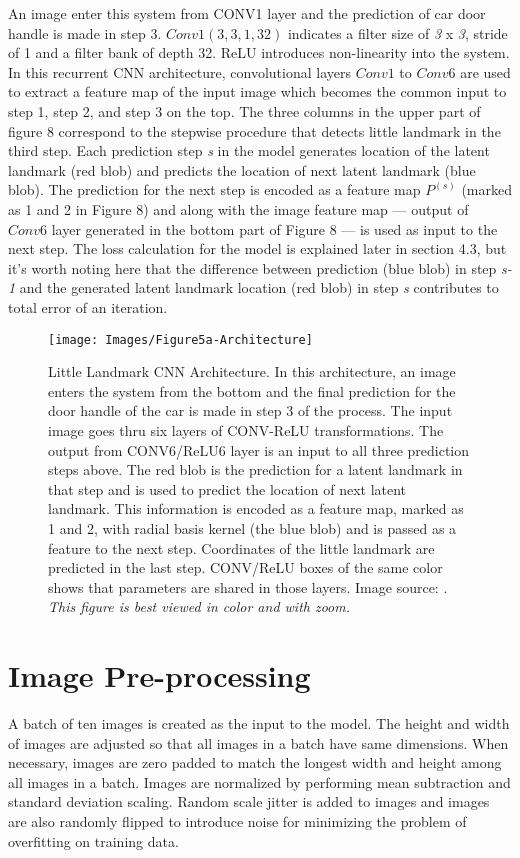 \documentclass [11pt,letterpaper ,twoside ,openany ]{report}
\begin{document}
    An image enter this system from CONV1 layer and the prediction of car door handle is made in step 3. \(Conv1(3,3,1,32) \) indicates a filter size of \textit{3} x \textit{3}, stride of 1 and a filter bank of depth 32. ReLU introduces non-linearity into the system. In this recurrent CNN architecture, convolutional layers \(Conv1\) to \(Conv6\) are used to extract a feature map of the input image which becomes the common input to step 1, step 2, and step 3 on the top. The three columns in the upper part of figure 8 correspond to the stepwise procedure that detects little landmark in the third step. Each prediction step \textit{s} in the model generates location of the latent landmark (red blob) and predicts the location of next latent landmark (blue blob). The prediction for the next step is encoded as a feature map \(P^{(s)}\) (marked as 1 and 2 in Figure 8) and along with the image feature map --- output of \(Conv6\) layer generated in the bottom part of Figure 8 --- is used as input to the next step. The loss calculation for the model is explained later in section 4.3, but it's worth noting here that the difference between prediction (blue blob) in step \textit {s-1} and the generated latent landmark location (red blob) in step \textit {s} contributes to total error of an iteration.

    \begin{figure}[t!]
      \centering
      \texttt{[image: Images/Figure5a-Architecture]}
      \caption{Little Landmark CNN Architecture. In this architecture, an image enters the system from the bottom and the final prediction for the door handle of the car is made in step 3 of the process. The input image goes thru six layers of CONV-ReLU transformations. The output from CONV6/ReLU6 layer is an input to all three prediction steps above. The red blob is the prediction for a latent landmark in that step and is used to predict the location of next latent landmark. This information is encoded as a feature map, marked as 1 and 2, with radial basis kernel (the blue blob) and is passed as a feature to the next step. Coordinates of the little landmark are predicted in the last step. CONV/ReLU boxes of the same color shows that parameters are shared in those layers. Image source: \cite{Singh_2016_CVPR}. \textit{This figure is best viewed in color and with zoom.}}
      \label{fig:arch}
    \end{figure}            

    \section{Image Pre-processing}
    A batch of ten images is created as the input to the model. The height and width of images are adjusted so that all images in a batch have same dimensions. When necessary, images are zero padded to match the longest width and height among all images in a batch. Images are normalized by performing mean subtraction and standard deviation scaling. Random scale jitter is added to images and images are also randomly flipped to introduce noise for minimizing the problem of overfitting on training data.
\end{document}
